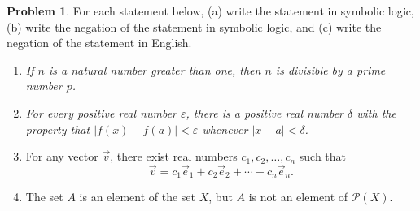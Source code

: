 \documentclass[12pt]{amsart}
\newcounter{problem_number}[section]
\theoremstyle{named}
\theoremstyle{definition}
\newtheorem{problem}{Problem}
\begin{document}
\begin{problem}
	For each statement below, (a) write the statement in symbolic logic, (b) write the negation of the statement in symbolic logic, and (c) write the negation of the statement in English.
	\begin{enumerate}
		\item \emph{If $n$ is a natural number greater than one, then $n$ is divisible by a prime number $p$.}
		\item \emph{For every positive real number $\varepsilon$, there is a positive real number $\delta$ with the property that $|f(x)-f(a)|<\varepsilon$ whenever $|x-a|<\delta$.}
		\item For any vector $\vec v$, there exist real numbers $c_1,c_2,\ldots,c_n$ such that
			$$\vec v = c_1\vec e_1 + c_2\vec e_2 + \cdots + c_n\vec e_n.$$
		\item The set $A$ is an element of the set $X$, but $A$ is not an element of $\mathscr P(X)$.
	\end{enumerate}
\end{problem}
\end{document}
